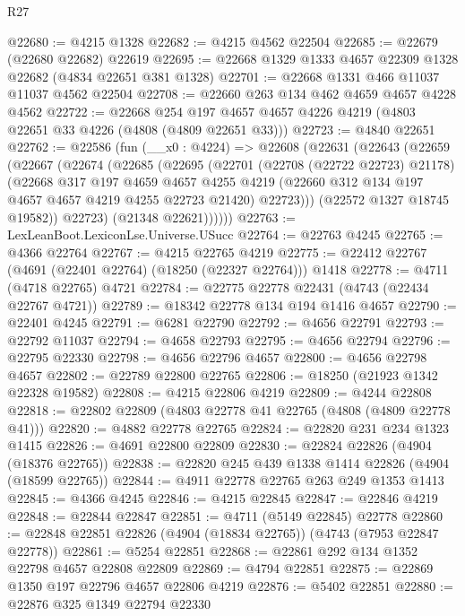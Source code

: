 \begin{lexlean}{R27}
\begin{coremodule}
@22680 := @4215 @1328
@22682 := @4215 @4562 @22504
@22685 := @22679 (@22680 @22682) @22619
@22695 := @22668 @1329 @1333 @4657 @22309 @1328 @22682 (@4834 @22651 @381 @1328)
@22701 := @22668 @1331 @466 @11037 @11037 @4562 @22504
@22708 := @22660 @263 @134 @462 @4659 @4657 @4228 @4562
@22722 := @22668
    @254
    @197
    @4657
    @4657
    @4226
    @4219
    (@4803 @22651 @33 @4226 (@4808 (@4809 @22651 @33)))
@22723 := @4840 @22651
@22762 := @22586
    (fun (__x0 : @4224) =>
    @22608
      (@22631
        (@22643
          (@22659
            (@22667
              (@22674
                (@22685
                  (@22695
                    (@22701
                      (@22708 (@22722 @22723) @21178)
                      (@22668
                        @317
                        @197
                        @4659
                        @4657
                        @4255
                        @4219
                        (@22660 @312 @134 @197 @4657 @4657 @4219 @4255 @22723 @21420)
                        @22723)))
                  (@22572 @1327 @18745 @19582))
                @22723)
              (@21348 @22621))))))
@22763 := LexLeanBoot.LexiconLse.Universe.USucc
@22764 := @22763 @4245
@22765 := @4366 @22764
@22767 := @4215 @22765 @4219
@22775 := @22412 @22767 (@4691 (@22401 @22764) (@18250 (@22327 @22764))) @1418
@22778 := @4711 (@4718 @22765) @4721
@22784 := @22775 @22778 @22431 (@4743 (@22434 @22767 @4721))
@22789 := @18342 @22778 @134 @194 @1416 @4657
@22790 := @22401 @4245
@22791 := @6281 @22790
@22792 := @4656 @22791
@22793 := @22792 @11037
@22794 := @4658 @22793
@22795 := @4656 @22794
@22796 := @22795 @22330
@22798 := @4656 @22796 @4657
@22800 := @4656 @22798 @4657
@22802 := @22789 @22800 @22765
@22806 := @18250 (@21923 @1342 @22328 @19582)
@22808 := @4215 @22806 @4219
@22809 := @4244 @22808
@22818 := @22802 @22809 (@4803 @22778 @41 @22765 (@4808 (@4809 @22778 @41)))
@22820 := @4882 @22778 @22765
@22824 := @22820 @231 @234 @1323 @1415
@22826 := @4691 @22800 @22809
@22830 := @22824 @22826 (@4904 (@18376 @22765))
@22838 := @22820 @245 @439 @1338 @1414 @22826 (@4904 (@18599 @22765))
@22844 := @4911 @22778 @22765 @263 @249 @1353 @1413
@22845 := @4366 @4245
@22846 := @4215 @22845
@22847 := @22846 @4219
@22848 := @22844 @22847
@22851 := @4711 (@5149 @22845) @22778
@22860 := @22848 @22851 @22826 (@4904 (@18834 @22765)) (@4743 (@7953 @22847 @22778))
@22861 := @5254 @22851
@22868 := @22861 @292 @134 @1352 @22798 @4657 @22808 @22809
@22869 := @4794 @22851
@22875 := @22869 @1350 @197 @22796 @4657 @22806 @4219
@22876 := @5402 @22851
@22880 := @22876 @325 @1349 @22794 @22330

\end{coremodule}
\end{lexlean}
